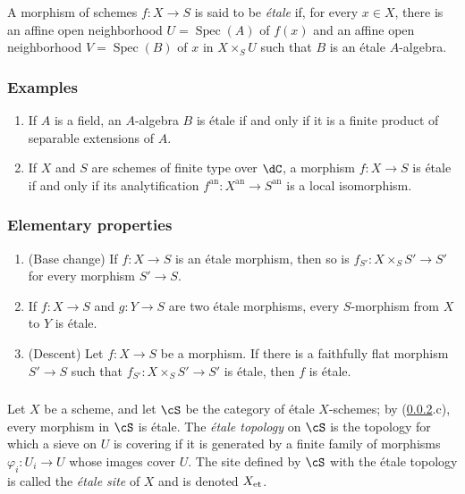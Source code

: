 \documentclass[12pt,oneside,english]{smfbook}
\DeclareMathOperator{\spec}{Spec}
\newcommand{\et}[1]{{#1}_{\textnormal{et}}}
\begin{document}
A morphism of schemes $f:X\to S$ is said to be \emph{étale} if, for every $x\in X$, there is an affine open neighborhood $U=\spec(A)$ of $f(x)$ and an affine open neighborhood $V=\spec(B)$ of $x$ in $X\times_SU$ such that $B$ is an étale $A$-algebra.

\subsubsection{Examples}\label{I:2-1-2}
\begin{enumerate}[\indent a)]
  \item If $A$ is a field, an $A$-algebra $B$ is étale if and only if it is a finite product of separable extensions of $A$.
  \item If $X$ and $S$ are schemes of finite type over $\dC$, a morphism $f:X\to S$ is étale if and only if its analytification $f^{\text{an}}:X^{\text{an}}\to S^{\text{an}}$ is a local isomorphism.
\end{enumerate}

\subsubsection{Elementary properties}\label{I:2-1-3}
\begin{enumerate}[\indent a)]
  \item (Base change) If $f:X\to S$ is an étale morphism, then so is $f_{S'}:X\times_SS'\to S'$ for every morphism $S'\to S$.
  \item If $f:X\to S$ and $g:Y\to S$ are two étale morphisms, every $S$-morphism from $X$ to $Y$ is étale.
  \item (Descent) Let $f:X\to S$ be a morphism. If there is a faithfully flat morphism $S'\to S$ such that $f_{S'}:X\times_SS'\to S'$ is étale, then $f$ is étale.
\end{enumerate}

\subsubsection{}\label{I:2-1-4}

Let $X$ be a scheme, and let $\cS$ be the category of étale $X$-schemes; by (\ref{I:2-1-3}.c), every morphism in $\cS$ is étale. The \emph{étale topology} on $\cS$ is the topology for which a sieve on $U$ is covering if it is generated by a finite family of morphisms $\varphi_i:U_i\to U$ whose images cover $U$. The site defined by $\cS$ with the étale topology is called the \emph{étale site} of $X$ and is denoted $\et X$.
\end{document}

